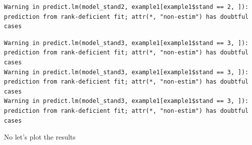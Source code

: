 \documentclass[
  letterpaper,
  DIV=11,
  numbers=noendperiod]{scrartcl}
\newenvironment{Shaded}{\begin{snugshade}}{\end{snugshade}}
\newcommand{\AttributeTok}[1]{\textcolor[rgb]{0.40,0.45,0.13}{#1}}
\newcommand{\CommentTok}[1]{\textcolor[rgb]{0.37,0.37,0.37}{#1}}
\newcommand{\DecValTok}[1]{\textcolor[rgb]{0.68,0.00,0.00}{#1}}
\newcommand{\FunctionTok}[1]{\textcolor[rgb]{0.28,0.35,0.67}{#1}}
\newcommand{\NormalTok}[1]{\textcolor[rgb]{0.00,0.23,0.31}{#1}}
\newcommand{\OtherTok}[1]{\textcolor[rgb]{0.00,0.23,0.31}{#1}}
\newcommand{\SpecialCharTok}[1]{\textcolor[rgb]{0.37,0.37,0.37}{#1}}
\newcommand{\StringTok}[1]{\textcolor[rgb]{0.13,0.47,0.30}{#1}}
\begin{document}
\begin{verbatim}
Warning in predict.lm(model_stand2, example1[example1$stand == 2, ]):
prediction from rank-deficient fit; attr(*, "non-estim") has doubtful cases
\end{verbatim}

\begin{verbatim}
Warning in predict.lm(model_stand3, example1[example1$stand == 3, ]):
prediction from rank-deficient fit; attr(*, "non-estim") has doubtful cases
Warning in predict.lm(model_stand3, example1[example1$stand == 3, ]):
prediction from rank-deficient fit; attr(*, "non-estim") has doubtful cases
Warning in predict.lm(model_stand3, example1[example1$stand == 3, ]):
prediction from rank-deficient fit; attr(*, "non-estim") has doubtful cases
\end{verbatim}

\begin{Shaded}
\end{Shaded}

No let's plot the results

\begin{Shaded}
\end{Shaded}
\end{document}

